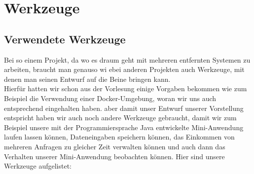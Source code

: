 \section{Werkzeuge}\label{Werkezuge}


\subsection{Verwendete Werkzeuge}

Bei so einem Projekt, da wo es draum geht mit mehreren entfernten Systemen zu arbeiten, braucht man genauso wi ebei anderen Projekten auch Werkzeuge, mit denen man seinen Entwurf auf die Beine bringen kann.\\

Hierfür hatten wir schon aus der Vorlesung einige Vorgaben bekommen wie zum Beispiel die Verwendung einer Docker-Umgebung, woran wir uns auch entsprechend eingehalten haben. aber damit unser Entwurf unserer Vorstellung entspricht haben wir auch noch andere Werkzeuge gebraucht, damit wir zum Beispiel unsere mit der Programmiersprache Java entwickelte Mini-Anwendung laufen lassen können, Dateneingaben speichern können, das Einkommen von mehreren Anfragen zu gleicher Zeit verwalten können und auch dann das Verhalten unserer Mini-Anwendung beobachten können. Hier sind unsere Werkzeuge aufgelistet:

